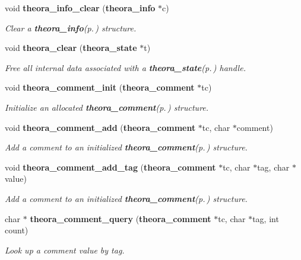 \begin{CompactItemize}
void {\bf theora\_\-info\_\-clear} ({\bf theora\_\-info} $\ast$c)
\begin{CompactList}\small\item\em Clear a {\bf theora\_\-info}{\rm (p.\,\pageref{structtheora__info})} structure. \item\end{CompactList}\item 
void {\bf theora\_\-clear} ({\bf theora\_\-state} $\ast$t)
\begin{CompactList}\small\item\em Free all internal data associated with a {\bf theora\_\-state}{\rm (p.\,\pageref{structtheora__state})} handle. \item\end{CompactList}\item 
void {\bf theora\_\-comment\_\-init} ({\bf theora\_\-comment} $\ast$tc)
\begin{CompactList}\small\item\em Initialize an allocated {\bf theora\_\-comment}{\rm (p.\,\pageref{structtheora__comment})} structure. \item\end{CompactList}\item 
void {\bf theora\_\-comment\_\-add} ({\bf theora\_\-comment} $\ast$tc, char $\ast$comment)
\begin{CompactList}\small\item\em Add a comment to an initialized {\bf theora\_\-comment}{\rm (p.\,\pageref{structtheora__comment})} structure. \item\end{CompactList}\item 
void {\bf theora\_\-comment\_\-add\_\-tag} ({\bf theora\_\-comment} $\ast$tc, char $\ast$tag, char $\ast$value)
\begin{CompactList}\small\item\em Add a comment to an initialized {\bf theora\_\-comment}{\rm (p.\,\pageref{structtheora__comment})} structure. \item\end{CompactList}\item 
char $\ast$ {\bf theora\_\-comment\_\-query} ({\bf theora\_\-comment} $\ast$tc, char $\ast$tag, int count)
\begin{CompactList}\small\item\em Look up a comment value by tag. \item\end{CompactList}\item 

\end{CompactItemize}
